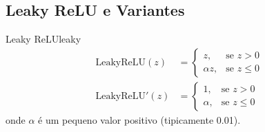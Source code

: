 \documentclass[a4paper,12pt]{article}
\begin{document}
\subsection{Leaky ReLU e Variantes}

\begin{definicao}{Leaky ReLU}{leaky}
\begin{align}
    \text{LeakyReLU}(z) &= \begin{cases}
        z, & \text{se } z > 0 \\
        \alpha z, & \text{se } z \leq 0
    \end{cases} \\
    \text{LeakyReLU}'(z) &= \begin{cases}
        1, & \text{se } z > 0 \\
        \alpha, & \text{se } z \leq 0
    \end{cases}
\end{align}
onde $\alpha$ é um pequeno valor positivo (tipicamente 0.01).
\end{definicao}
\end{document}
